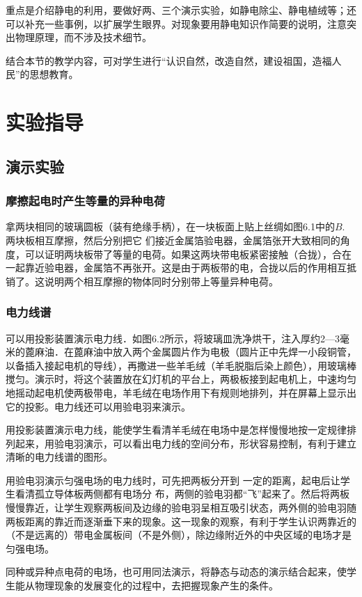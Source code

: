 重点是介绍静电的利用，要做好两、三个演示实验，如静电除尘、静电植绒等；还可以补充一些事例，以扩展学生眼界。对现象要用静电知识作简要的说明，注意突出物理原理，而不涉及技术细节。

结合本节的教学内容，可对学生进行“认识自然，改造自然，建设祖国，造福人民”的思想教育。

\section{实验指导}
\subsection{演示实验}
\subsubsection{摩擦起电时产生等量的异种电荷}

拿两块相同的玻璃圆板（装有绝缘手柄），在一块板面上贴上丝绸如图6.1中的$B$. 两块板相互摩擦，然后分别把它
们接近金属箔验电器，金属箔张开大致相同的角度，可以证明两块板带了等量的电荷。如果这两块带电板紧密接触（合拢），合在一起靠近验电器，金属箔不再张开。这是由于两板带的电，合拢以后的作用相互抵销了。这说明两个相互摩擦的物体同时分别带上等量异种电荷。

\begin{figure}[htp]
    \centering
    \caption{}
\end{figure}

\subsubsection{电力线谱}

可以用投影装置演示电力线．如图6.2所示，将玻璃皿洗净烘干，注入厚约2—3毫米的蓖麻油．在蓖麻油中放入两个金属圆片作为电极（圆片正中先焊一小段铜管，以备插入接起电机的导线），再撒进一些羊毛绒（羊毛脱脂后染上颜色），用玻璃棒搅匀。演示时，将这个装置放在幻灯机的平台上，两极板接到起电机上，中速均匀地摇动起电机使两极带电，羊毛绒在电场作用下有规则地排列，并在屏幕上显示出它的投影。电力线还可以用验电羽来演示。

用投影装置演示电力线，能使学生看清羊毛绒在电场中是怎样慢慢地按一定规律排列起来，用验电羽演示，可以看出电力线的空间分布，形状容易控制，有利于建立清晰的电力线谱的图形。

用验电羽演示匀强电场的电力线时，可先把两板分开到
一定的距离，起电后让学生看清孤立导体板两侧都有电场分
布，两侧的验电羽都“飞”起来了。然后将两板慢慢靠近，让学生观察两板间及边缘的验电羽呈相互吸引状态，两外侧的验电羽随两板距离的靠近而逐渐垂下来的现象。这一现象的观察，有利于学生认识两靠近的（不是远离的）带电金属板间（不是外侧），除边缘附近外的中央区域的电场才是匀强电场。

同种或异种点电荷的电场，也可用同法演示，将静态与动态的演示结合起来，使学生能从物理现象的发展变化的过程中，去把握现象产生的条件。

















